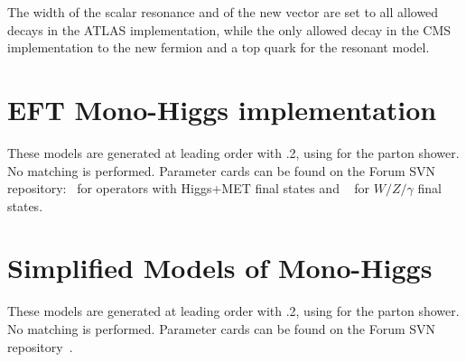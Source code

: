 The width of the scalar resonance and of the new vector are set to all allowed decays in the ATLAS implementation,
while the only allowed decay in the CMS implementation to the new fermion and a top quark for the resonant model. 

\section{EFT Mono-Higgs implementation}

These models are generated at leading
order with .2, using \pythiaEight for the parton shower. No matching is performed. 
Parameter cards can be found on the Forum SVN repository:~\cite{ForumSVN_EWMonoHiggs} for operators with Higgs+MET final states
and ~\cite{ForumSVN_EWEFTD7} for $W/Z/\gamma$ final states.

\section{Simplified Models of Mono-Higgs}

These models are generated at leading
order with .2, using \pythiaEight for the parton shower. No matching is performed. 
Parameter cards can be found on the Forum SVN 
repository~\cite{ForumSVN_EWMonoHiggs_2HDM, ForumSVN_EWMonoHiggs}.
